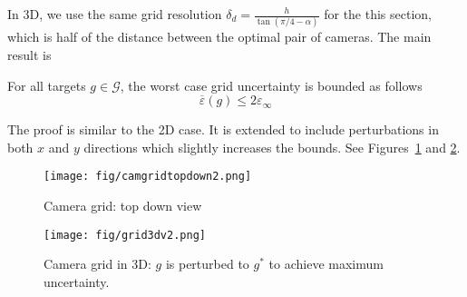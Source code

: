 In 3D, we use the same grid resolution $\delta_d = \frac{h}{\tan(\pi/4-\alpha)}$ for the this section, which is half of the distance between the optimal pair of cameras. The main result is

\begin{theorem}\label{thrm:grid3d2}
For all targets $g \in \mathcal{G}$, the worst case grid uncertainty is bounded as follows
$$
\overline{\varepsilon}(g) \leqslant 2 \varepsilon_\infty
$$
\end{theorem}

The proof is similar to the 2D case. It is extended to include perturbations in both $x$ and $y$ directions which slightly increases the bounds.
See Figures~\ref{fig:camgridtopdown} and \ref{fig:grid3dv2}.

\begin{figure}[h]
\centering
	\texttt{[image: fig/camgridtopdown2.png]}
	\caption{Camera grid: top down view}
	\label{fig:camgridtopdown}
\end{figure} 

\begin{figure}[h]
\centering
	\texttt{[image: fig/grid3dv2.png]}
	\caption{Camera grid in 3D: $g$ is perturbed to $g^*$ to achieve maximum uncertainty.}
	\label{fig:grid3dv2}
\end{figure} 
